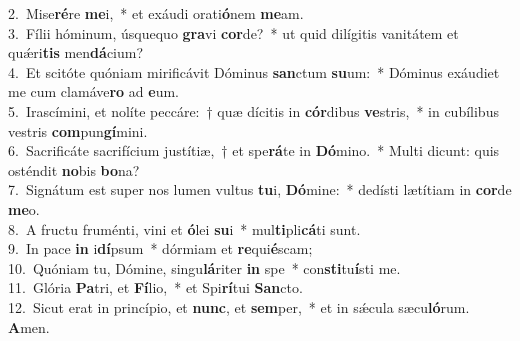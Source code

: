 {2.~}Mise\textbf{ré}re \textbf{me}i,~* et exáudi orati\textbf{ó}nem \textbf{me}am.\\
{3.~}Fílii hóminum, úsquequo \textbf{gra}vi \textbf{cor}de?~* ut quid dilígitis vanitátem et quǽri\textbf{tis} men\textbf{dá}cium?\\
{4.~}Et scitóte quóniam mirificávit Dóminus \textbf{san}ctum \textbf{su}um:~* Dóminus exáudiet me cum clamáve\textbf{ro} ad \textbf{e}um.\\
{5.~}Irascímini, et nolíte peccáre:~† quæ dícitis in \textbf{cór}dibus \textbf{ve}stris,~* in cubílibus vestris \textbf{com}pun\textbf{gí}mini.\\
{6.~}Sacrificáte sacrifícium justítiæ,~† et spe\textbf{rá}te in \textbf{Dó}mino.~* Multi dicunt: quis osténdit \textbf{no}bis \textbf{bo}na?\\
{7.~}Signátum est super nos lumen vultus \textbf{tu}i, \textbf{Dó}mine:~* dedísti lætítiam in \textbf{cor}de \textbf{me}o.\\
{8.~}A fructu fruménti, vini et \textbf{ó}lei \textbf{su}i~* mul\textbf{ti}pli\textbf{cá}ti sunt.\\
{9.~}In pace \textbf{in} i\textbf{dí}psum~* dórmiam et \textbf{re}qui\textbf{é}scam;\\
{10.~}Quóniam tu, Dómine, singu\textbf{lá}riter \textbf{in} spe~* con\textbf{sti}tu\textbf{í}sti me.\\
{11.~}Glória \textbf{Pa}tri, et \textbf{Fí}lio,~* et Spi\textbf{rí}tui \textbf{San}cto.\\
{12.~}Sicut erat in princípio, et \textbf{nunc}, et \textbf{sem}per,~* et in sǽcula sæcu\textbf{ló}rum. \textbf{A}men.\\
